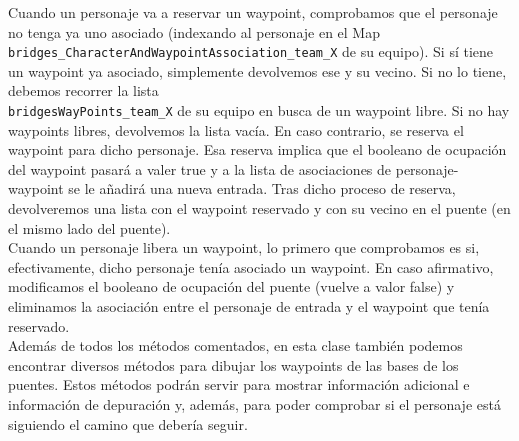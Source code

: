 Cuando un personaje va a reservar un waypoint, comprobamos que el personaje no tenga ya uno asociado (indexando al personaje en el Map \texttt{bridges\_CharacterAndWaypointAssociation\_team\_X} de su equipo). Si sí tiene un waypoint ya asociado, simplemente devolvemos ese y su vecino. Si no lo tiene, debemos recorrer la lista\\
\texttt{bridgesWayPoints\_team\_X} de su equipo en busca de un waypoint libre. Si no hay waypoints libres, devolvemos la lista vacía. En caso contrario, se reserva el waypoint para dicho personaje. Esa reserva implica que el booleano de ocupación del waypoint pasará a valer true y a la lista de asociaciones de personaje-waypoint se le añadirá una nueva entrada. Tras dicho proceso de reserva, devolveremos una lista con el waypoint reservado y con su vecino en el puente (en el mismo lado del puente). \\

Cuando un personaje libera un waypoint, lo primero que comprobamos es si, efectivamente, dicho personaje tenía asociado un waypoint. En caso afirmativo, modificamos el booleano de ocupación del puente (vuelve a valor false) y eliminamos la asociación entre el personaje de entrada y el waypoint que tenía reservado. \\

Además de todos los métodos comentados, en esta clase también podemos encontrar diversos métodos para dibujar los waypoints de las bases de los puentes. Estos métodos podrán servir para mostrar información adicional e información de depuración y, además, para poder comprobar si el personaje está siguiendo el camino que debería seguir.


